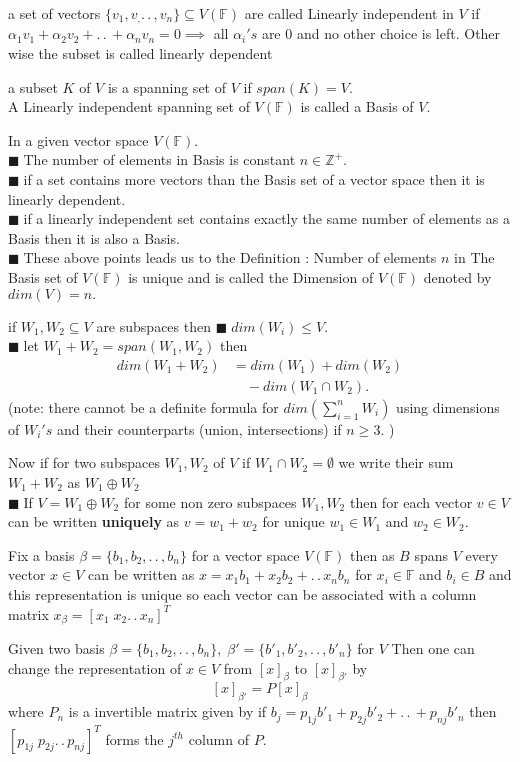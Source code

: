 \documentclass[11pt]{extarticle}
\newcommand{\Z}{\mathbb{Z}}
\newcommand{\F}{\mathbb{F}}
\newcommand{\ck}{.\,.\,}
\newcommand{\snote}[1]{{\footnotesize(#1)}}
\newcommand{\tbx}[2][]{
	\begin{tcolorbox}[enhanced,breakable,size=small,colback=black!2!white,title={#1},arc is angular, arc=1.5mm,drop fuzzy shadow]
		#2
	\end{tcolorbox}
}
\newcommand{\y}{$\blacksquare\;$}
\newcommand{\yi}{\\$\blacksquare\;$}
\begin{document}
\begin{multicols}{2}
	\tbx[Dependence]{ a set of vectors $ \{v_1,v_,\ck, v_n\} \subseteq V(\F)$ are called Linearly independent in $ V $ if $ \alpha_1v_1+\alpha_2v_2+\ck+\alpha_nv_n=0 \implies $ all $ \alpha_i's$ are $ 0 $ and no other choice is left. Other wise the subset is called linearly dependent}
	\tbx[Basis]{  a subset $ K $ of $ V $ is a spanning set of $ V $ if $ span(K)=V.$\\
	A Linearly independent spanning set of $ V(\F) $ is called a Basis of $ V. $ 
	}
	\tbx[Dimension]{ In a given vector space $ V(\F) .$
	\yi The number of elements in Basis is constant $ n\in \Z^+. $ 
	\yi if a set contains more vectors than the Basis set of a vector space then it is linearly dependent.
	\yi if a linearly independent set contains exactly the same number of elements as a Basis then it is also a Basis.
	\yi These above points leads us to the Definition : Number of elements $ n $  in The Basis set of $ V(\F) $ is unique and is called the Dimension of $ V(\F)$ denoted by $ dim(V)=n. $ }
	\tbx{ if $ W_1,W_2\subseteq V $ are subspaces then 
	\y $ dim(W_i) \leq V.$ 
	\yi let $ W_1+W_2=span(W_1,W_2) $ then 
	\begin{align*}
		dim(W_1+W_2) &= dim(W_1)+dim(W_2)\\
		& \quad -dim(W_1\cap W_2).
	\end{align*}
	\snote{note: there cannot be a definite formula for $ dim(\sum_{i=1}^{n}W_i) $ using dimensions of $ W_i's $ and their counterparts (union, intersections) if $ n\geq 3 $. }}
	\tbx[Direct sum]{ Now if for two subspaces $ W_1,W_2 $ of $V $ if $ W_1\cap W_2=\emptyset $ we write their sum $ W_1+W_2 $ as $ W_1\oplus W_2 $ 
	\yi If $ V=W_1\oplus W_2 $ for some non zero subspaces $ W_1,W_2 $ then for each vector $ v\in V $ can be written \textbf{uniquely} as $ v=w_1+w_2 $ for unique $ w_1\in W_1 $ and $ w_2\in W_2. $  }
	\tbx[Matrix Representation of vectors]{ Fix a basis $ \beta=\{b_1,b_2,\ck, b_n\} $ for a vector space $ V(\F) $ then as $ B $ spans $ V $  every vector  $x \in  V $ can be written as $ x=x_1b_1+x_2b_2+\ck x_nb_n $ for $ x_i\in \F $ and $ b_i\in B $ and this representation is unique so each vector can be associated with a column matrix $ x_\beta=[x_1\; x_2\ck x_n]^T $ }
	\tbx[Change of Basis Matrix]{  Given two basis $ \beta= \{b_1,b_2,\ck, b_n\}, \; \beta' =\{b'_1,b'_2,\ck, b'_n\} $ for $ V $ Then one can change the representation of $ x\in V $ from $ [x]_\beta $ to $ [x]_{\beta'} $ by 
	\[[x]_{\beta'}=P[x]_\beta\] where $ P_n $ is a invertible matrix given by if $ b_j=p_{1j}b'_1+p_{2j}b'_2+\ck +p_{nj}b'_n$ then $ [p_{1j}\; p_{2j} \ck p_{nj}]^T $ forms the $ j^{th} $ column of $ P. $}

\end{multicols}
\end{document}
